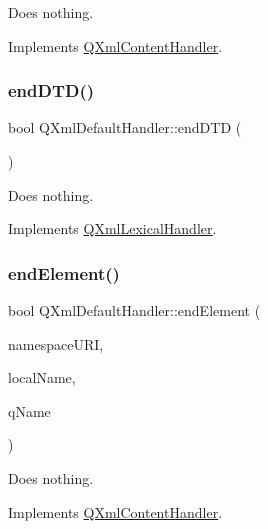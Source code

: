 Does nothing. 

Implements \mbox{\hyperlink{class_q_xml_content_handler_a534bd1e4627e65340eb17d90d1ab1c12}{Q\+Xml\+Content\+Handler}}.

\mbox{\label{class_q_xml_default_handler_abc0de9f5db640394347d6c8c4c416c84}} 
\subsubsection{\texorpdfstring{endDTD()}{endDTD()}}
{\footnotesize\ttfamily bool Q\+Xml\+Default\+Handler\+::end\+D\+TD (\begin{DoxyParamCaption}{ }\end{DoxyParamCaption})\hspace{0.3cm}{\ttfamily [virtual]}}

Does nothing. 

Implements \mbox{\hyperlink{class_q_xml_lexical_handler_a7f5188d7a0a54b6c276c5e7e2faa72bc}{Q\+Xml\+Lexical\+Handler}}.

\mbox{\label{class_q_xml_default_handler_ae5d92a2fbae15a793aedf725b62b16c2}} 
\subsubsection{\texorpdfstring{endElement()}{endElement()}}
{\footnotesize\ttfamily bool Q\+Xml\+Default\+Handler\+::end\+Element (\begin{DoxyParamCaption}\item[{const \mbox{\hyperlink{class_q_string}{Q\+String}} \&}]{namespace\+U\+RI,  }\item[{const \mbox{\hyperlink{class_q_string}{Q\+String}} \&}]{local\+Name,  }\item[{const \mbox{\hyperlink{class_q_string}{Q\+String}} \&}]{q\+Name }\end{DoxyParamCaption})\hspace{0.3cm}{\ttfamily [virtual]}}

Does nothing. 

Implements \mbox{\hyperlink{class_q_xml_content_handler_af0abc06326798a6e522f91e6174b7b9e}{Q\+Xml\+Content\+Handler}}.



